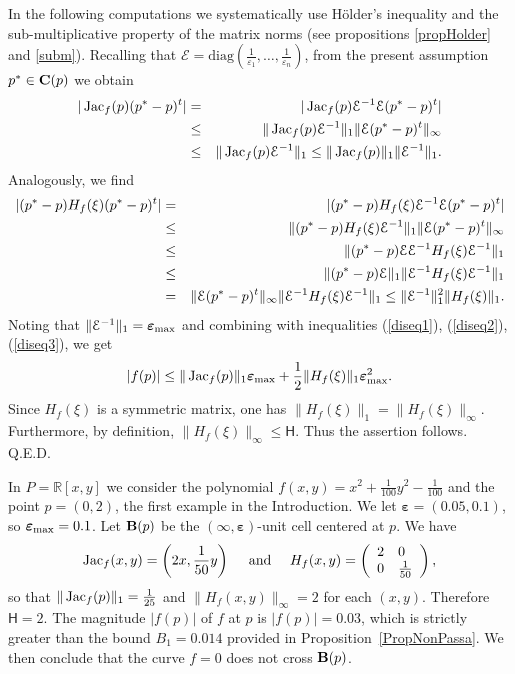 \documentclass[10pt]{article}
\newcommand\qed{{\hspace*{\fill}Q.E.D.\vskip12pt plus 1pt}}
\newcommand\sE{{\cal E}}
\newcommand\R{{\mathbb R}}
\newcommand{\epsbold}{{\bm \varepsilon}}
\def\Jac{\mathop{\rm Jac}\nolimits}
\newtheorem{examp}[theorem]{Example}
\newenvironment{example*}{\begin{examp}\em}{\end{examp}}
\begin{document}
In the following computations we systematically use H\"older's inequality  and
the sub-multiplicative property of the matrix norms (see propositions \ref{propHolder} and \ref{subm}). Recalling that 
${\mathcal E}=\textrm{diag}(\frac{1}{\varepsilon_1},\ldots,\frac{1}{\varepsilon_n})$, from  the present assumption  $p^* \in {\bf C}(p)$ 
 we obtain
\begin{eqnarray}\label{diseq2}
 |\Jac_f(p) (p^*-p)^t| & = &  |\Jac_f(p) \sE^{-1} \sE (p^*-p)^t| \nonumber \\ 
 &\le&  \|\Jac_f(p) \sE^{-1}\|_1 \|\sE (p^*-p)^t\|_\infty \nonumber \\ 
 &\le& \|\Jac_f(p) \sE^{-1}\|_1 \le  \|\Jac_f(p)\|_1 \|\sE^{-1}\|_1.
\end{eqnarray}
Analogously, we find
\begin{eqnarray}\label{diseq3}
|(p^*-p) H_f(\xi) (p^*-p)^t| & = &  |(p^*-p) H_f(\xi) \sE^{-1} \sE(p^*-p)^t| \nonumber \\ 
&\le&  \|(p^*-p) H_f(\xi) \sE^{-1}\|_1 \|\sE(p^*-p)^t\|_\infty \nonumber \\ 
&\le& \|(p^*-p) \sE \sE^{-1} H_f(\xi) \sE^{-1}\|_1 \nonumber \\
&\le& \|(p^*-p) \sE\|_1\| \sE^{-1} H_f(\xi) \sE^{-1}\|_1 \nonumber \\
&=& \|\sE(p^*-p)^t\|_\infty \| \sE^{-1} H_f(\xi) \sE^{-1}\|_1\le \|\sE^{-1}\|_1^2 \| H_f(\xi)\|_1.
\end{eqnarray}
Noting that $\|\sE^{-1}\|_1 =\epsbold_{\rm max}$ and
combining  with inequalities 
(\ref{diseq1}), (\ref{diseq2}), (\ref{diseq3}), we get
\begin{eqnarray*}
|f(p)| \le \|\Jac_f(p)\|_1 \epsbold_{\rm max} + \frac{1}{2}  \|H_f(\xi)\|_1 \epsbold_{\rm max}^2.
\end{eqnarray*}
Since $H_f(\xi)$ is a symmetric matrix, one has $\|H_f(\xi)\|_1=\|H_f(\xi)\|_\infty$. Furthermore,
 by definition, $\|H_f(\xi)\|_\infty \le {\mathsf H}$.
Thus the assertion  follows.
\qed

\begin{example*}
In $P=\R[x,y]$ we consider the polynomial
$f(x,y)=x^2+ \frac{1}{100}y^2-\frac{1}{100}$ 
and the point $p=(0,2)$,   the first  example in the Introduction.
We let $\epsbold =(0.05, 0.1)$, so
$\epsbold_{\rm max}=0.1$.
Let  ${\bf B}(p)$ be
  the $(\infty,\epsbold)$-unit cell   centered at $p$.
We have
\begin{eqnarray*}
\Jac_f(x,y)= \left(2x, \frac{1}{50}y \right)\quad \textrm{ and } \quad 
H_f(x,y)=\left ( \begin{array}{ll}
2 & 0\\
0 & \frac{1}{50}
\end{array}\right), 
\end{eqnarray*}
so that $\|\Jac_f(p)\|_1 =\frac{1}{25}$ and 
$\|H_f(x,y)\|_\infty = 2$ for each $(x,y)$. Therefore ${\mathsf H}=2$.
The magnitude $|f(p)|$ of $f$ at $p$ is $|f(p)|=0.03$, which is strictly greater than  
 the bound $B_1=0.014$ provided in Proposition~\ref{PropNonPassa}. 
We then  conclude that the curve $f=0$ does not cross ${\bf B}(p)$.
\end{example*}
\end{document}
